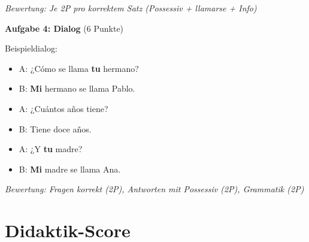 \documentclass[11pt,a4paper]{article}
\begin{document}
\textit{Bewertung: Je 2P pro korrektem Satz (Possessiv + llamarse + Info)}

\vspace{1em}

\textbf{Aufgabe 4: Dialog} (6 Punkte)

Beispieldialog:
\begin{itemize}
    \item A: ¿Cómo se llama \textbf{tu} hermano?
    \item B: \textbf{Mi} hermano se llama Pablo.
    \item A: ¿Cuántos años tiene?
    \item B: Tiene doce años.
    \item A: ¿Y \textbf{tu} madre?
    \item B: \textbf{Mi} madre se llama Ana.
\end{itemize}

\textit{Bewertung: Fragen korrekt (2P), Antworten mit Possessiv (2P), Grammatik (2P)}

\newpage
\section{Didaktik-Score}
\end{document}
